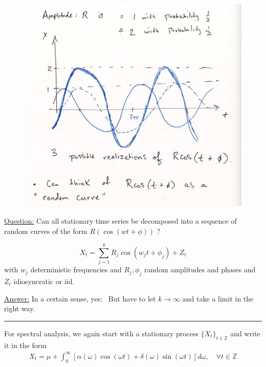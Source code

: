 \begin{figure}[h]
\includegraphics[scale=0.25]{images/Screenshot 2024-04-29 at 08.38.59.jpg}
\centering
\end{figure}

\underline{Question:} Can all stationary time series be decomposed into a sequence of random curves of the form $R(\cos(wt + \phi))$ ? 

\[X_t = \sum_{j=1}^k R_j \cos(w_j t +\phi_j)+Z_t \]
with $w_j$ deterministic frequencies and $R_j, \phi_j$ random amplitudes and phases and $Z_t$ idiosyncratic or iid. 

\underline{Answer:} In a certain sense, yes: \
But have to let $k\rightarrow \infty$ and take a limit in the right way. \\

\noindent
\rule{\linewidth}{0.4pt}
\bigskip

For spectral analysis, we again start with a stationary process $\{X_t\}_{t\in \mathbb{Z}}$ and write it in the form 
\begin{align}
    X_t=\mu+\int_0^\infty \left[\alpha(\omega) \cos(\omega t) + \delta(\omega) \sin(\omega t) \right] d\omega, \quad \forall t \in \mathbb{Z} \label{SP1}
\end{align}


